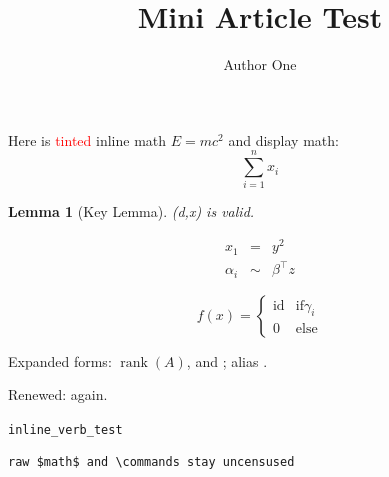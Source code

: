 \documentclass{article}
\newcommand{\pair}[2][d]{(#1,#2)}
\newtheorem{lemma}{Lemma}
\DeclareMathOperator{\rank}{rank}
\newcommand{\wrap}{\mathsf{W}}
\newcommand{\double}{\wrap\wrap}
\let\alias\wrap
\begin{document}
\title{Mini Article Test}
\author{Author One}
\maketitle

% 



Here is \textcolor{red}{tinted} inline math $E=mc^2$ and display math:
\[ \sum_{i=1}^n x_i \]

\begin{lemma}[Key Lemma]
\pair{x} is valid.
\end{lemma}

\begin{eqnarray*}
x_1 &=& y^2 \\
\alpha_i &\sim& \beta^\top z
\end{eqnarray*}

\[ f(x)=\begin{cases} \mathrm{id}& \mbox{if} \gamma_i \\ 0&\mbox{else} \end{cases} \]

Expanded forms: $\rank(A)$, \wrap{} and \double; alias \alias.

\renewcommand{\wrap}{\mathsf{V}}
Renewed: \wrap{} again.

\verb|inline_verb_test|

\begin{verbatim}
raw $math$ and \commands stay uncensused
\end{verbatim}





\end{document}
